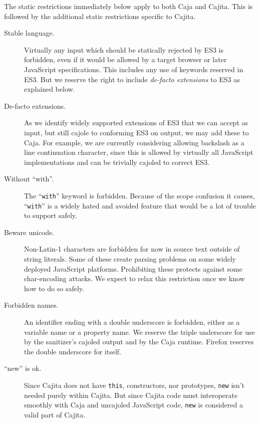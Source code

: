 \documentclass[letterpaper,twocolumn,10pt]{article}
\newcommand{\code}[1]{{\tt {#1}}}              %
\begin{document}
The static restrictions immediately below apply to both Caja and Cajita. This 
is followed by the additional static restrictions specific to Cajita.

\begin{description}

    \item[Stable language.] Virtually any input which should be statically 
    rejected by ES3 is forbidden, even if it would be allowed by a target 
    browser or later JavaScript specifications. This includes any use of 
    keywords reserved in ES3. But we reserve the right to include 
    \emph{de-facto extensions} to ES3 as explained below.
    
    \item[De-facto extensions.] As we identify widely supported extensions of 
    ES3 that we can accept as input, but still cajole to conforming ES3 on 
    output, we may add these to Caja. For example, we are currently 
    considering allowing backslash as a line continuation character, since 
    this is allowed by virtually all JavaScript implementations and can be 
    trivially cajoled to correct ES3.

    \item[Without ``with''.] The ``\code{with}'' keyword is forbidden. 
    Because of the scope confusion it causes, ``\code{with}'' is a widely 
    hated and avoided feature that would be a lot of trouble to support 
    safely.

    \item[Beware unicode.] Non-Latin-1 characters are forbidden for now in 
    source text outside of string literals. Some of these create parsing 
    problems on some widely deployed JavaScript platforms. Prohibiting these 
    protects against some char-encoding attacks. We expect to relax this 
    restriction once we know how to do so safely.

    \item[Forbidden names.] An identifier ending with a double underscore is 
    forbidden, either as a variable name or a property name. We reserve the 
    triple underscore for use by the sanitizer's cajoled output and by the 
    Caja runtime. Firefox reserves the double underscore for itself.
    
    \item[``new'' is ok.] Since Cajita does not have \code{this}, 
    constructors, nor prototypes, \code{new} isn't needed purely within 
    Cajita. But since Cajita code must interoperate smoothly with Caja and 
    uncajoled JavaScript code, \code{new} is considered a valid part of 
    Cajita.
        
\end{description}
\end{document}
